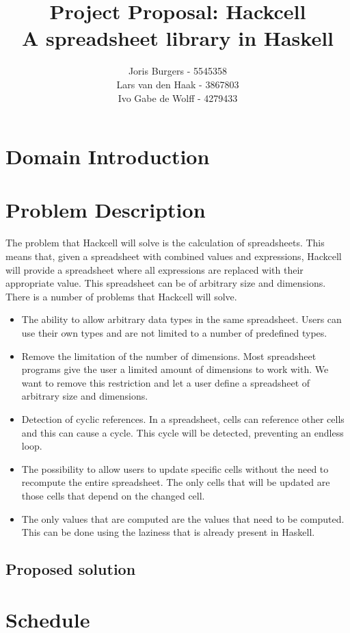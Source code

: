 \documentclass{article}
\title{
	\vskip -3cm
	Project Proposal: Hackcell \\
	\vskip 0.5cm
	\large{A spreadsheet library in Haskell}
}
\author{Joris Burgers - 5545358\\ Lars van den Haak - 3867803\\ Ivo Gabe de Wolff - 4279433}
\begin{document}
	\maketitle
	\section{Domain Introduction}
	
	\section{Problem Description}
	The problem that Hackcell will solve is the calculation of spreadsheets. This means that, given a spreadsheet with combined values and expressions, Hackcell will provide a spreadsheet where all expressions are replaced with their appropriate value. This spreadsheet can be of arbitrary size and dimensions. There is a number of problems that Hackcell will solve.
\begin{itemize}
	\item The ability to allow arbitrary data types in the same spreadsheet. Users can use their own types and are not limited to a number of predefined types. 
	\item Remove the limitation of the number of dimensions. Most spreadsheet programs give the user a limited amount of dimensions to work with. We want to remove this restriction and let a user define a spreadsheet of arbitrary size and dimensions.
	\item Detection of cyclic references. In a spreadsheet, cells can reference other cells and this can cause a cycle. This cycle will be detected, preventing an endless loop.
	\item The possibility to allow users to update specific cells without the need to recompute the entire spreadsheet. The only cells that will be updated are those cells that depend on the changed cell.
	\item The only values that are computed are the values that need to be computed. This can be done using the laziness that is already present in Haskell. 
\end{itemize}	
	
		
	\subsection*{Proposed solution}
	
		
	\section{Schedule}
\end{document}
